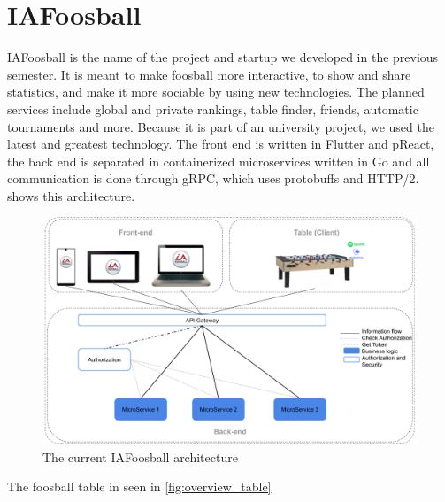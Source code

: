 \section{IAFoosball}
IAFoosball is the name of the project and startup we developed in the previous semester. It is meant to make foosball more interactive, to show and share statistics, and make it more sociable by using new technologies. The planned services include global and private rankings, table finder, friends, automatic tournaments and more. Because it is part of an university project, we used the latest and greatest technology. The front end is written in Flutter and pReact, the back end is separated in containerized microservices written in Go and all communication is done through gRPC, which uses protobuffs and HTTP/2.  shows this architecture.

\begin{figure}[h!]
    \centering
    \includegraphics[scale=0.2]{figures/architecture-old.png}%
    \caption{The current IAFoosball architecture}\label{fig:architectureCurr}
\end{figure}

The foosball table in seen in \cref{fig:overview_table} 

